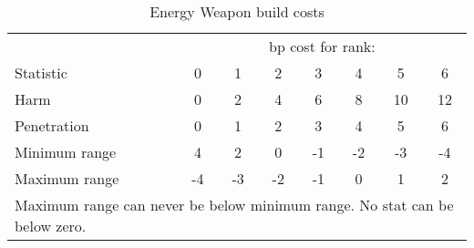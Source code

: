 
\begin{table}[ht]\centering
\begin{tabular}{l ccccccc}
\toprule
{}		& \multicolumn{7}{c}{bp cost for rank:} \\
Statistic	& 0	&1&2&3&4&5&6 \\
\midrule
Harm		&  0 &  2 &  4 &  6 &  8 & 10 & 12 \\
Penetration	&  0 &  1 &  2 &  3 &  4 &  5 &  6 \\
Minimum range	&  4 &  2 &  0 & -1 & -2 & -3 & -4 \\
Maximum range	& -4 & -3 & -2 & -1 &  0 &  1 &  2 \\
\bottomrule
\multicolumn{8}{p{0.6\columnwidth}}{
Maximum range can never be below minimum range.
\newline
No stat can be below zero.
}
\end{tabular}
\caption{Energy Weapon build costs}
\label{tab:energy-weapon-build-costs}
\end{table}
